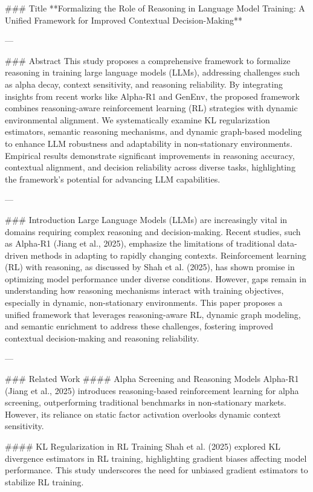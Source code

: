 ### Title  
**Formalizing the Role of Reasoning in Language Model Training: A Unified Framework for Improved Contextual Decision-Making**

---

### Abstract  
This study proposes a comprehensive framework to formalize reasoning in training large language models (LLMs), addressing challenges such as alpha decay, context sensitivity, and reasoning reliability. By integrating insights from recent works like Alpha-R1 and GenEnv, the proposed framework combines reasoning-aware reinforcement learning (RL) strategies with dynamic environmental alignment. We systematically examine KL regularization estimators, semantic reasoning mechanisms, and dynamic graph-based modeling to enhance LLM robustness and adaptability in non-stationary environments. Empirical results demonstrate significant improvements in reasoning accuracy, contextual alignment, and decision reliability across diverse tasks, highlighting the framework's potential for advancing LLM capabilities.

---

### Introduction  
Large Language Models (LLMs) are increasingly vital in domains requiring complex reasoning and decision-making. Recent studies, such as Alpha-R1 (Jiang et al., 2025), emphasize the limitations of traditional data-driven methods in adapting to rapidly changing contexts. Reinforcement learning (RL) with reasoning, as discussed by Shah et al. (2025), has shown promise in optimizing model performance under diverse conditions. However, gaps remain in understanding how reasoning mechanisms interact with training objectives, especially in dynamic, non-stationary environments. This paper proposes a unified framework that leverages reasoning-aware RL, dynamic graph modeling, and semantic enrichment to address these challenges, fostering improved contextual decision-making and reasoning reliability.

---

### Related Work  
#### Alpha Screening and Reasoning Models  
Alpha-R1 (Jiang et al., 2025) introduces reasoning-based reinforcement learning for alpha screening, outperforming traditional benchmarks in non-stationary markets. However, its reliance on static factor activation overlooks dynamic context sensitivity.

#### KL Regularization in RL Training  
Shah et al. (2025) explored KL divergence estimators in RL training, highlighting gradient biases affecting model performance. This study underscores the need for unbiased gradient estimators to stabilize RL training.

